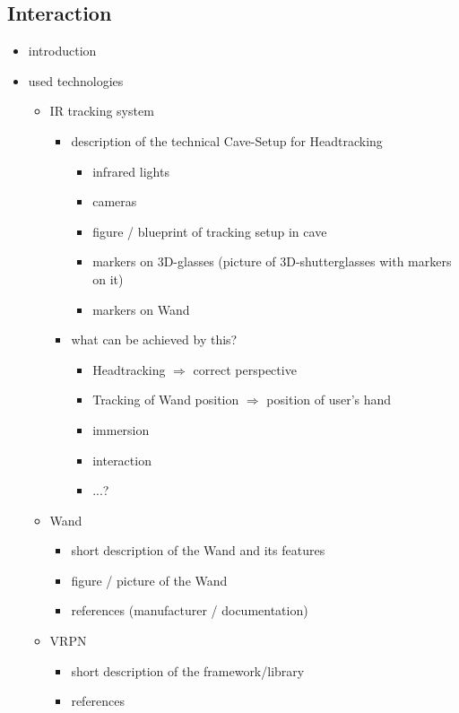 \documentclass[conference]{acmsiggraph}
\begin{document}

\subsection{Interaction}
\begin{itemize}
\item introduction
\item{ used technologies
	\begin{itemize}
	\item{IR tracking system
		\begin{itemize}
		\item{description of the technical Cave-Setup for Headtracking
			\begin{itemize}
			\item infrared lights
			\item cameras
			\item figure / blueprint of tracking setup in cave
			\item markers on 3D-glasses (picture of 3D-shutterglasses with markers on it)
			\item markers on Wand
			\end{itemize}
		}
		\item{what can be achieved by this?
			\begin{itemize}
				\item Headtracking $\Rightarrow$ correct perspective
				\item Tracking of Wand position $\Rightarrow$ position of user's hand
				\item immersion
				\item interaction
				\item ...?
			\end{itemize}		
		}
		\end{itemize}
	}
	\item{Wand
		\begin{itemize}
		\item short description of the Wand and its features
		\item figure / picture of the Wand
		\item references (manufacturer / documentation)
		\end{itemize}
	}
	\item{VRPN
		\begin{itemize}
		\item short description of the framework/library
		\item references

\end{itemize}}
\end{itemize}}
\end{itemize}
\end{document}
